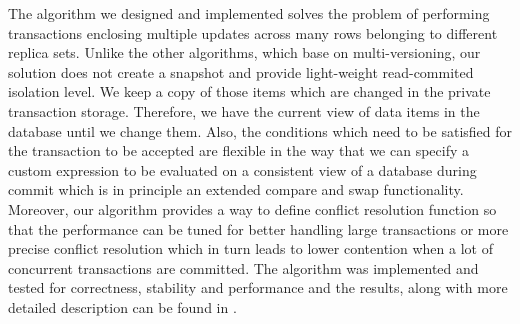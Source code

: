 \documentclass[runningheads,a4paper]{llncs}
\begin{document}
The algorithm we designed and implemented solves the problem of performing transactions enclosing multiple updates across many rows belonging to different replica sets. Unlike the other algorithms, which base on multi-versioning, our solution does not create a snapshot and provide light-weight read-commited isolation level. We keep a copy of those items which are changed in the private transaction storage. Therefore, we have the current view of data items in the database until we change them. Also, the conditions which need to be satisfied for the transaction to be accepted are flexible in the way that we can specify a custom expression to be evaluated on a consistent view of a database during commit which is in principle an extended compare and swap functionality. Moreover, our algorithm provides a way to define conflict resolution function so that the performance can be tuned for better handling large transactions or more precise conflict resolution which in turn leads to lower contention when a lot of concurrent transactions are committed.
The algorithm was implemented and tested for correctness, stability and performance and the results, along with more detailed description can be found in \cite{masterthesis}.



 
\end{document}
